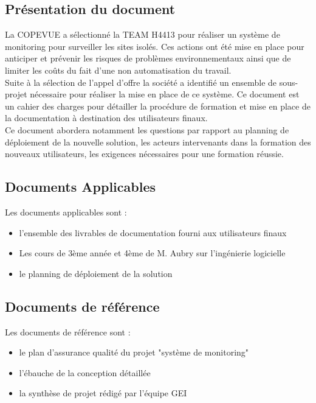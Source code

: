 
\subsection{Présentation du document}
La COPEVUE a sélectionné la TEAM H4413 pour réaliser un système de monitoring pour 
surveiller les sites isolés. Ces actions ont été mise en place pour anticiper et prévenir
les risques de problèmes environnementaux ainsi que de limiter les coûts du fait
d'une non automatisation du travail. \\

Suite à la sélection de l'appel d'offre la société a identifié un ensemble de sous-projet
nécessaire pour réaliser la mise en place de ce système. Ce document est un cahier des charges
pour détailler la procédure de formation et mise en place de la documentation à destination des 
utilisateurs finaux. \\

Ce document abordera notamment les questions par rapport au planning de déploiement 
de la nouvelle solution, les acteurs intervenants dans la formation des nouveaux 
utilisateurs, les exigences nécessaires pour une formation réussie.


\subsection{Documents Applicables}

Les documents applicables sont :
\begin{itemize}
\item l'ensemble des livrables de documentation fourni aux utilisateurs finaux
\item Les cours de 3ème année et 4ème de M. Aubry sur l'ingénierie logicielle
\item le planning de déploiement de la solution
\end{itemize}

\subsection{Documents de référence}

Les documents de référence sont : 
\begin{itemize}
\item le plan d'assurance qualité du projet "système de monitoring"
\item l'ébauche de la conception détaillée
\item la synthèse de projet rédigé par l'équipe GEI
\end{itemize}

